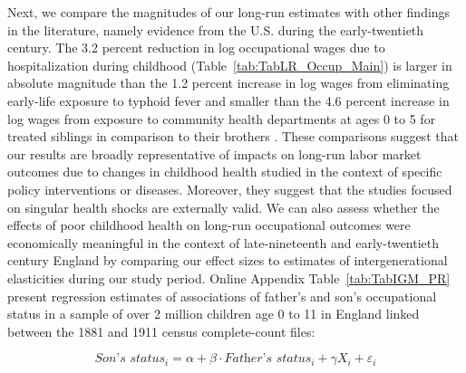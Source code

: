 \documentclass[12pt,english]{article}
\begin{document}
Next, we compare the magnitudes of our long-run estimates with other findings in the literature, namely evidence from the U.S. during the early-twentieth century. The 3.2 percent reduction in log occupational wages due to hospitalization during childhood (Table~\ref{tab:TabLR_Occup_Main}) is larger in absolute magnitude than the 1.2 percent increase in log wages from eliminating early-life exposure to typhoid fever \citep{Beach-etal2016} and smaller than the 4.6 percent increase in log wages from exposure to community health departments at ages 0 to 5 for treated siblings in comparison to their brothers \citep{Velasco2019}. These comparisons suggest that our results are broadly representative of impacts on long-run labor market outcomes due to changes in childhood health studied in the context of specific policy interventions or diseases. Moreover, they suggest that the studies focused on singular health shocks are externally valid. We can also assess whether the effects of poor childhood health on long-run occupational outcomes were economically meaningful in the context of late-nineteenth and early-twentieth century England by comparing our effect sizes to estimates of intergenerational elasticities during our study period. Online Appendix Table~\ref{tab:TabIGM_PR} present regression estimates of associations of father's and son's occupational status in a sample of over 2 million children age 0 to 11 in England linked between the 1881 and 1911 census complete-count files:

\begin{equation}
    \textit{Son's status}_i = \alpha + \beta\cdot\textit{Father's status}_i + \gamma X_i + \varepsilon_i
\end{equation}
\end{document}
